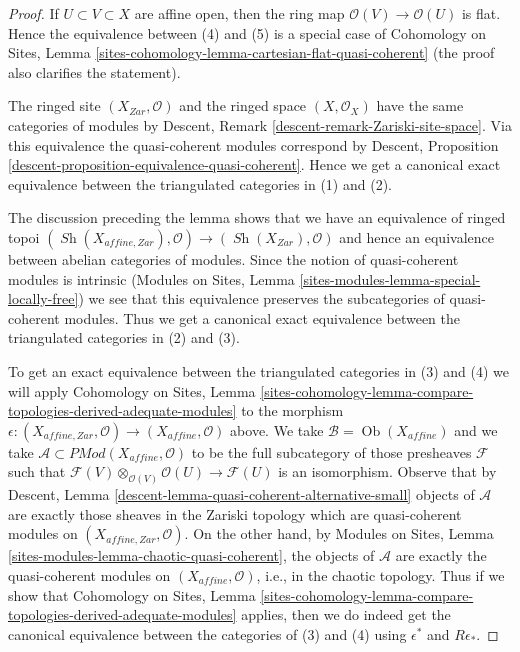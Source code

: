 \documentclass{stacks-project}
\theoremstyle{plain}
\theoremstyle{definition}
\theoremstyle{remark}
\numberwithin{equation}{subsection}
\def\Ob{\mathop{\mathrm{Ob}}\nolimits}
\def\Sh{\mathop{\mathit{Sh}}\nolimits}
\begin{document}
\begin{proof}
If $U \subset V \subset X$ are affine open, then the ring map
$\mathcal{O}(V) \to \mathcal{O}(U)$ is flat. Hence
the equivalence between (4) and (5) is a special case of
Cohomology on Sites, Lemma
\ref{sites-cohomology-lemma-cartesian-flat-quasi-coherent}
(the proof also clarifies the statement).

\medskip\noindent
The ringed site $(X_{Zar}, \mathcal{O})$ and the ringed space
$(X, \mathcal{O}_X)$ have the same categories of modules by
Descent, Remark \ref{descent-remark-Zariski-site-space}.
Via this equivalence the quasi-coherent modules correspond by
Descent, Proposition \ref{descent-proposition-equivalence-quasi-coherent}.
Hence we get a canonical exact equivalence between the triangulated
categories in (1) and (2).

\medskip\noindent
The discussion preceding the lemma shows that we have an equivalence of
ringed topoi
$(\Sh(X_{affine, Zar}), \mathcal{O}) \to (\Sh(X_{Zar}), \mathcal{O})$
and hence an equivalence between abelian categories of modules.
Since the notion of quasi-coherent modules is intrinsic
(Modules on Sites, Lemma \ref{sites-modules-lemma-special-locally-free})
we see that this equivalence preserves the subcategories
of quasi-coherent modules. Thus  we get a canonical exact equivalence
between the triangulated categories in (2) and (3).

\medskip\noindent
To get an exact equivalence between the triangulated categories
in (3) and (4) we will apply Cohomology on Sites, Lemma
\ref{sites-cohomology-lemma-compare-topologies-derived-adequate-modules}
to the morphism $\epsilon : (X_{affine, Zar}, \mathcal{O}) \to
(X_{affine}, \mathcal{O})$ above. We take
$\mathcal{B} = \Ob(X_{affine})$ and we take
$\mathcal{A} \subset \textit{PMod}(X_{affine}, \mathcal{O})$
to be the full subcategory of those presheaves $\mathcal{F}$
such that $\mathcal{F}(V) \otimes_{\mathcal{O}(V)} \mathcal{O}(U)
\to \mathcal{F}(U)$ is an isomorphism. Observe that by
Descent, Lemma \ref{descent-lemma-quasi-coherent-alternative-small}
objects of $\mathcal{A}$ are exactly those sheaves in the Zariski
topology which are quasi-coherent modules on $(X_{affine, Zar}, \mathcal{O})$.
On the other hand, by Modules on Sites, Lemma
\ref{sites-modules-lemma-chaotic-quasi-coherent},
the objects of $\mathcal{A}$ are exactly the quasi-coherent modules
on $(X_{affine}, \mathcal{O})$, i.e., in the chaotic topology.
Thus if we show that Cohomology on Sites, Lemma
\ref{sites-cohomology-lemma-compare-topologies-derived-adequate-modules}
applies, then we do indeed get the canonical equivalence between the
categories of (3) and (4) using $\epsilon^*$ and $R\epsilon_*$.


\end{proof}
\end{document}
